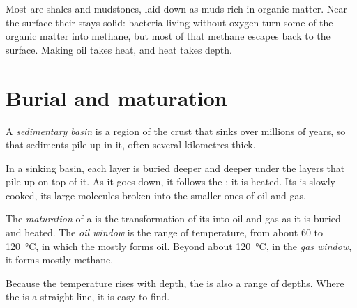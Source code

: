 Most  are shales and mudstones, laid down as muds rich in
organic matter. Near the surface their  stays solid: bacteria living
without oxygen turn some of the organic matter into methane, but most of
that methane escapes back to the surface. Making oil takes heat, and heat takes depth.

\section{Burial and maturation}

\begin{definition}\label{def:g11:fossil-fuel-geology:basin}
A \emph{sedimentary basin} is a region of the crust
that sinks over millions of years, so that sediments pile up in it, often
several kilometres thick.
\end{definition}

In a sinking basin, each layer is buried deeper and deeper under the layers
that pile up on top of it. As it goes down, it follows the : it is
heated. Its  is slowly cooked, its large molecules broken into the
smaller ones of oil and gas.

\begin{definition}\label{def:g11:fossil-fuel-geology:oil-window}
The \emph{maturation} of a  is the
transformation of its  into oil and gas as it is buried and heated.
The \emph{oil window} is the range of temperature, from
about 60 to \qty{120}{\degreeCelsius}, in which the  mostly forms oil.
Beyond about \qty{120}{\degreeCelsius}, in the \emph{gas
window}, it forms mostly methane.
\end{definition}

Because the temperature rises with depth, the  is also a range of
depths. Where the  is a straight line, it is easy to find.

